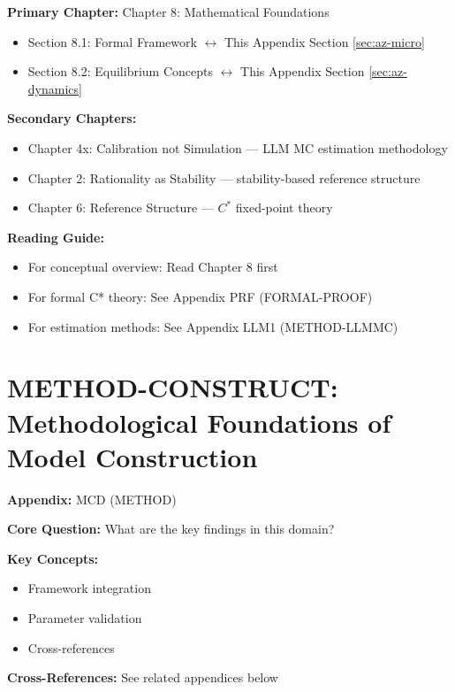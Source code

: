 \begin{tcolorbox}[colback=purple!5!white, colframe=purple!75!black,
    title=Chapter Linkage]

\textbf{Primary Chapter:} Chapter 8: Mathematical Foundations
\begin{itemize}[nosep]
\item Section 8.1: Formal Framework $\leftrightarrow$ This Appendix Section \ref{sec:az-micro}
\item Section 8.2: Equilibrium Concepts $\leftrightarrow$ This Appendix Section \ref{sec:az-dynamics}
\end{itemize}

\textbf{Secondary Chapters:}
\begin{itemize}[nosep]
\item Chapter 4x: Calibration not Simulation --- LLM MC estimation methodology
\item Chapter 2: Rationality as Stability --- stability-based reference structure
\item Chapter 6: Reference Structure --- $C^*$ fixed-point theory
\end{itemize}

\textbf{Reading Guide:}
\begin{itemize}[nosep]
\item For conceptual overview: Read Chapter 8 first
\item For formal C* theory: See Appendix PRF (FORMAL-PROOF)
\item For estimation methods: See Appendix LLM1 (METHOD-LLMMC)
\end{itemize}

\end{tcolorbox}

\chapter{METHOD-CONSTRUCT: Methodological Foundations of Model Construction}
\label{app:az-construct}


\begin{tcolorbox}[colback=blue!5!white, colframe=blue!75!black,
    title=Quick Reference: Appendix MCD]

\textbf{Appendix:} MCD (METHOD)

\textbf{Core Question:} What are the key findings in this domain?

\textbf{Key Concepts:}
\begin{itemize}[nosep]
\item Framework integration
\item Parameter validation
\item Cross-references
\end{itemize}

\textbf{Cross-References:} See related appendices below
\end{tcolorbox}


